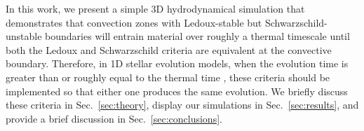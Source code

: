 In this work, we present a simple 3D hydrodynamical simulation that demonstrates that convection zones with Ledoux-stable but Schwarzschild-unstable boundaries will entrain material over roughly a thermal timescale until both the Ledoux and Schwarzschild criteria are equivalent at the convective boundary.
Therefore, in 1D stellar evolution models, when the evolution time is greater than or roughly equal to the thermal time \citep[such as on the main sequence, see][]{georgy_etal_2021}, these criteria should be implemented so that either one produces the same evolution.
We briefly discuss these criteria in Sec.~\ref{sec:theory}, display our simulations in Sec.~\ref{sec:results}, and provide a brief discussion in Sec.~\ref{sec:conclusions}.

